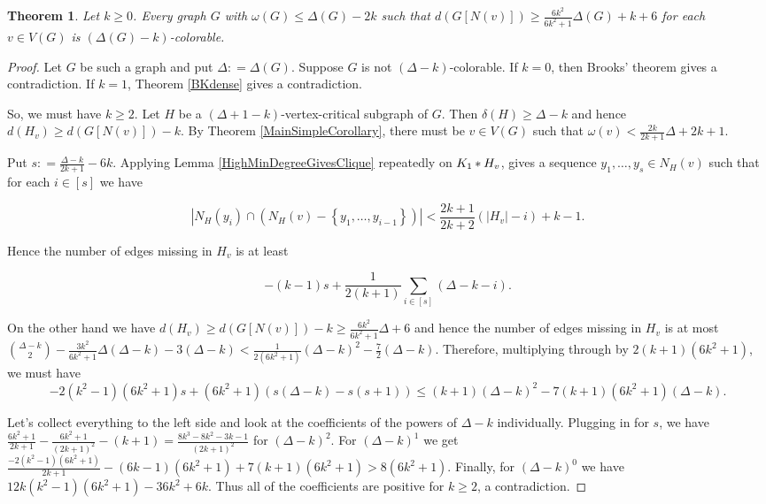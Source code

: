 \documentclass[12pt]{article}
\theoremstyle{plain}
\newtheorem{thm}{Theorem}[section]
\theoremstyle{definition}
\theoremstyle{remark}
\newcommand{\set}[1]{\left\{ #1 \right\}}
\newcommand{\card}[1]{\left|#1\right|}
\newcommand{\irange}[1]{\left[#1\right]}
\newcommand{\join}[2]{#1 \mbox{\hspace{2 pt}$\ast$\hspace{2 pt}} #2}
\newcommand{\parens}[1]{\left( #1 \right)}
\newcommand{\DefinedAs}{\mathrel{\mathop:}=}
\begin{document}
\begin{thm}\label{MainResult}
Let $k \geq 0$. Every graph $G$ with $\omega(G) \leq \Delta(G) - 2k$ such that $d(G[N(v)]) \geq \frac{6k^2}{6k^2 + 1}\Delta(G) + k + 6$ for each $v \in V(G)$ is $(\Delta(G)-k)$-colorable.
\end{thm}
\begin{proof}
Let $G$ be such a graph and put $\Delta \DefinedAs \Delta(G)$.  Suppose $G$ is not $(\Delta-k)$-colorable. If $k=0$, then Brooks' theorem gives a contradiction. If $k=1$, Theorem \ref{BKdense} gives a contradiction.

So, we must have $k \geq 2$.  Let $H$ be a $(\Delta + 1 - k)$-vertex-critical subgraph of $G$.  Then $\delta(H) \geq \Delta - k$ and hence $d(H_v) \geq d(G[N(v)]) - k$.  By Theorem \ref{MainSimpleCorollary}, there must be $v \in V(G)$ such that $\omega(v) < \frac{2k}{2k+1}\Delta + 2k + 1$.

Put $s \DefinedAs \frac{\Delta-k}{2k+1} - 6k$. Applying Lemma \ref{HighMinDegreeGivesClique} repeatedly on $\join{K_1}{H_v}$, gives a sequence $y_1, \ldots, y_s \in N_H(v)$ such that for each $i \in \irange{s}$ we have

\[\card{N_H(y_i) \cap (N_H(v) - \set{y_1, \ldots, y_{i-1}})} < \frac{2k+1}{2k+2}(\card{H_v} - i) + k - 1.\]

Hence the number of edges missing in $H_v$ is at least

\[-(k-1)s + \frac{1}{2(k+1)}\sum_{i \in \irange{s}} \parens{\Delta - k - i}.\]

On the other hand we have $d(H_v) \geq d(G[N(v)]) - k \geq \frac{6k^2}{6k^2 + 1}\Delta + 6$ and hence the number of edges missing in $H_v$ is at most $\binom{\Delta-k}{2} - \frac{3k^2}{6k^2 + 1}\Delta (\Delta - k) - 3(\Delta - k) < \frac{1}{2(6k^2 + 1)} (\Delta-k)^2 - \frac{7}{2}(\Delta - k)$.  Therefore, multiplying through by $2(k+1)(6k^2+1)$, we must have
\[-2(k^2-1)(6k^2+1)s + (6k^2+1)\parens{s(\Delta - k) - s(s+1)} \leq (k+1)(\Delta-k)^2 - 7(k+1)(6k^2+1)(\Delta - k).\]

Let's collect everything to the left side and look at the coefficients of the powers of $\Delta - k$ individually.  Plugging in for $s$, we have $\frac{6k^2 + 1}{2k+1} - \frac{6k^2+1}{(2k+1)^2} - (k+1) = \frac{8k^3 - 8k^2 - 3k - 1}{(2k+1)^2}$ for $(\Delta - k)^2$.  For $(\Delta-k)^1$ we get $\frac{-2(k^2-1)(6k^2+1)}{2k+1} - (6k-1)(6k^2+1) + 7(k+1)(6k^2+1) > 8(6k^2+1)$. Finally, for $(\Delta-k)^0$
we have $12k(k^2-1)(6k^2+1) - 36k^2 + 6k$.  Thus all of the coefficients are positive for $k \geq 2$, a contradiction.
\end{proof}
\end{document}
